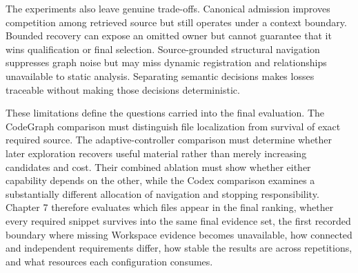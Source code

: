 The experiments also leave genuine trade-offs. Canonical admission improves competition among retrieved source but still operates under a context boundary. Bounded recovery can expose an omitted owner but cannot guarantee that it wins qualification or final selection. Source-grounded structural navigation suppresses graph noise but may miss dynamic registration and relationships unavailable to static analysis. Separating semantic decisions makes losses traceable without making those decisions deterministic.

These limitations define the questions carried into the final evaluation. The CodeGraph comparison must distinguish file localization from survival of exact required source. The adaptive-controller comparison must determine whether later exploration recovers useful material rather than merely increasing candidates and cost. Their combined ablation must show whether either capability depends on the other, while the Codex comparison examines a substantially different allocation of navigation and stopping responsibility. Chapter 7 therefore evaluates which files appear in the final ranking, whether every required snippet survives into the same final evidence set, the first recorded boundary where missing Workspace evidence becomes unavailable, how connected and independent requirements differ, how stable the results are across repetitions, and what resources each configuration consumes.
